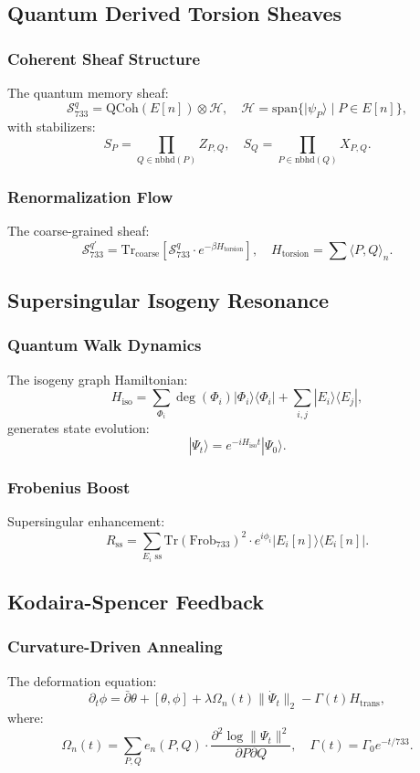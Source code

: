 \documentclass[12pt]{article}
\begin{document}
\begin{center}
\subsection{Quantum Derived Torsion Sheaves}
\subsubsection{Coherent Sheaf Structure}
The quantum memory sheaf:
\[
\mathcal{S}_{733}^q = \text{QCoh}(E[n]) \otimes \mathcal{H}, \quad \mathcal{H} = \text{span}\{ |\psi_P\rangle \mid P \in E[n] \},
\]
with stabilizers:
\[
S_P = \prod_{Q \in \text{nbhd}(P)} Z_{P,Q}, \quad S_Q = \prod_{P \in \text{nbhd}(Q)} X_{P,Q}.
\]

\subsubsection{Renormalization Flow}
The coarse-grained sheaf:
\[
\mathcal{S}_{733}^{q'} = \text{Tr}_{\text{coarse}} \left[ \mathcal{S}_{733}^q \cdot e^{-\beta H_{\text{torsion}}} \right], \quad H_{\text{torsion}} = \sum \langle P,Q \rangle_n.
\]

\subsection{Supersingular Isogeny Resonance}
\subsubsection{Quantum Walk Dynamics}
The isogeny graph Hamiltonian:
\[
H_{\text{iso}} = \sum_{\Phi_i} \deg(\Phi_i) |\Phi_i\rangle \langle \Phi_i| + \sum_{i,j} |E_i\rangle \langle E_j|,
\]
generates state evolution:
\[
|\Psi_t\rangle = e^{-i H_{\text{iso}} t} |\Psi_0\rangle.
\]

\subsubsection{Frobenius Boost}
Supersingular enhancement:
\[
R_{\text{ss}} = \sum_{E_i \text{ ss}} \text{Tr}(\text{Frob}_{733})^2 \cdot e^{i \phi_i} |E_i[n]\rangle \langle E_i[n]|.
\]

\subsection{Kodaira-Spencer Feedback}
\subsubsection{Curvature-Driven Annealing}
The deformation equation:
\[
\partial_t \phi = \bar{\partial} \theta + [\theta, \phi] + \lambda \Omega_n(t) \|\dot{\Psi}_t\|_2 - \Gamma(t) H_{\text{trans}},
\]
where:
\[
\Omega_n(t) = \sum_{P,Q} e_n(P,Q) \cdot \frac{\partial^2 \log \|\Psi_t\|^2}{\partial P \partial Q}, \quad \Gamma(t) = \Gamma_0 e^{-t/733}.
\]


\end{center}
\end{document}
